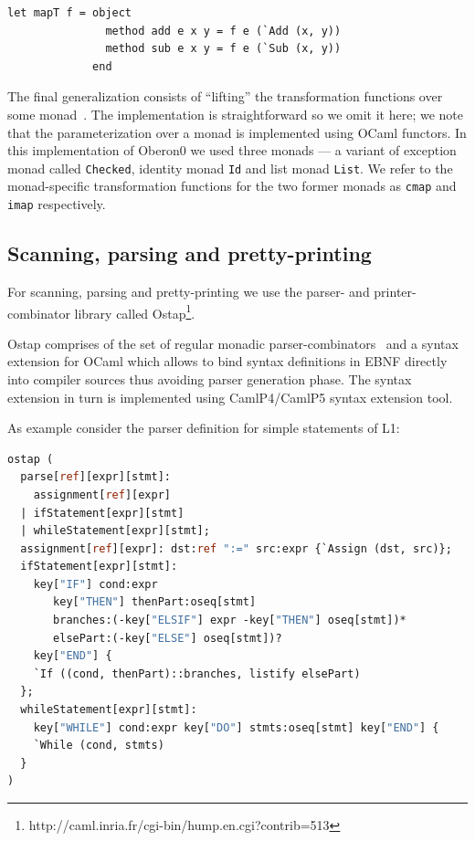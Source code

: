\begin{lstlisting}
let mapT f = object
               method add e x y = f e (`Add (x, y))
               method sub e x y = f e (`Sub (x, y))
             end
\end{lstlisting}

The final generalization consists of ``lifting'' the transformation functions
over some monad~\cite{Monads}. The implementation is straightforward so we omit it
here; we note that the parameterization over a monad is implemented using OCaml functors. 
In this implementation of Oberon0 we used three monads --- a variant 
of exception monad called \lstinline{Checked}, identity monad \lstinline{Id} and list 
monad \lstinline{List}. We refer to the monad-specific transformation functions for 
the two former monads as \lstinline{cmap} and \lstinline{imap} respectively.

\subsection{Scanning, parsing and pretty-printing}

For scanning, parsing and pretty-printing we use the parser- and printer-combinator
library called Ostap\footnote{http://caml.inria.fr/cgi-bin/hump.en.cgi?contrib=513}. 

Ostap comprises of the set of regular monadic parser-combinators~\cite{MonadicParserCombinators} 
and a syntax extension for OCaml which allows to bind syntax definitions in
EBNF directly into compiler sources thus avoiding parser generation phase. The syntax
extension in turn is implemented using CamlP4/CamlP5 syntax extension 
tool. 

As example consider the parser definition for simple statements of L1:

\begin{lstlisting}[language=ocaml]
ostap (
  parse[ref][expr][stmt]: 
    assignment[ref][expr] 
  | ifStatement[expr][stmt] 
  | whileStatement[expr][stmt];
  assignment[ref][expr]: dst:ref ":=" src:expr {`Assign (dst, src)};
  ifStatement[expr][stmt]: 
    key["IF"] cond:expr 
       key["THEN"] thenPart:oseq[stmt]
       branches:(-key["ELSIF"] expr -key["THEN"] oseq[stmt])*
       elsePart:(-key["ELSE"] oseq[stmt])?
    key["END"] {
    `If ((cond, thenPart)::branches, listify elsePart)
  };
  whileStatement[expr][stmt]: 
    key["WHILE"] cond:expr key["DO"] stmts:oseq[stmt] key["END"] {
    `While (cond, stmts)
  }
)
\end{lstlisting}

